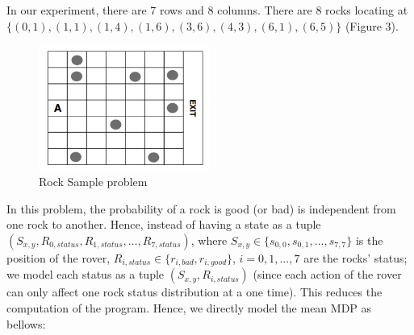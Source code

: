 \documentclass{article}
\begin{document}
In our experiment, there are 7 rows and 8 columns. There are 8 rocks
locating at $\{(0,1), (1,1), (1,4), (1,6), (3,6), (4,3), (6,1), (6,5)\}$
(Figure 3).

\begin{figure}[h!]
\centering
\includegraphics[width=0.5\textwidth]{rocksample.png}
\caption{Rock Sample problem}
\label{fig:RockSampleProb}
\end{figure}

In this problem, the probability of a rock is good (or bad) is independent from one
rock to another. Hence, instead of having a state as a tuple 
$(S_{x,y},R_{0,status}, R_{1,status}, \dots, R_{7,status})$, 
where $S_{x,y} \in \{s_{0,0}, s_{0,1}, \dots, s_{7,7}\}$ 
is the position of the rover, $R_{i,status} \in \{r_{i,bad}, r_{i,good}\}$,
$i=0,1,\dots,7$ are the rocks' status; we model each status as a tuple
$(S_{x,y},R_{i,status})$ (since each action of the rover can only
affect one rock status distribution at a one time). This reduces the computation
of the program. Hence, we directly model the mean MDP as bellows:
\end{document}
